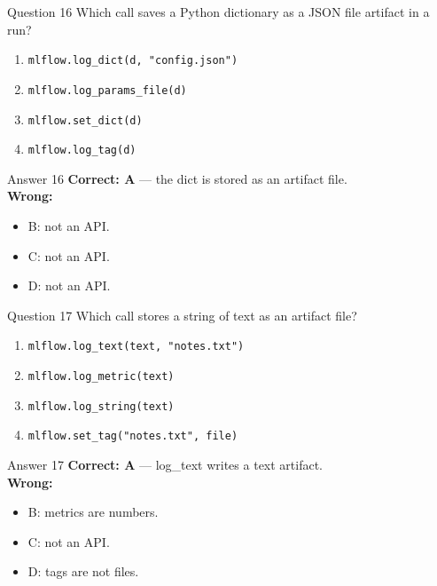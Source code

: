 \documentclass[aspectratio=169,11pt]{beamer}
\begin{document}
\begin{frame}{Question 16}
Which call saves a Python dictionary as a JSON file artifact in a run?
\begin{enumerate}[label=\Alph*.]
\item \texttt{mlflow.log\_dict(d, "config.json")}
\item \texttt{mlflow.log\_params\_file(d)}
\item \texttt{mlflow.set\_dict(d)}
\item \texttt{mlflow.log\_tag(d)}
\end{enumerate}
\end{frame}
\begin{frame}{Answer 16}
\textbf{Correct: A} --- the dict is stored as an artifact file.\\
\vspace{0.5em}
\textbf{Wrong:}
\begin{itemize}
\item B: not an API.
\item C: not an API.
\item D: not an API.
\end{itemize}
\end{frame}

\begin{frame}{Question 17}
Which call stores a string of text as an artifact file?
\begin{enumerate}[label=\Alph*.]
\item \texttt{mlflow.log\_text(text, "notes.txt")}
\item \texttt{mlflow.log\_metric(text)}
\item \texttt{mlflow.log\_string(text)}
\item \texttt{mlflow.set\_tag("notes.txt", file)}
\end{enumerate}
\end{frame}
\begin{frame}{Answer 17}
\textbf{Correct: A} --- log\_text writes a text artifact.\\
\vspace{0.5em}
\textbf{Wrong:}
\begin{itemize}
\item B: metrics are numbers.
\item C: not an API.
\item D: tags are not files.
\end{itemize}
\end{frame}
\end{document}
